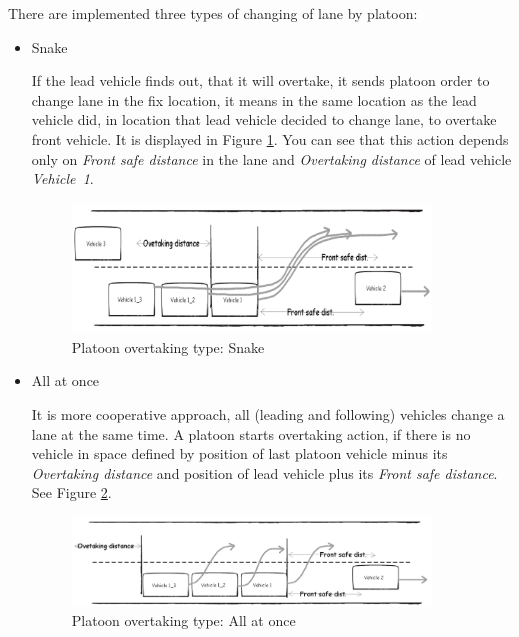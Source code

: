 There are implemented three types of changing of lane by platoon:

\begin{itemize}
\item Snake

If the lead vehicle finds out, that it will overtake, it sends platoon order to change lane in the fix location, it means in the same location as the lead vehicle did, in location that lead vehicle decided to change lane, to overtake front vehicle. It is displayed in Figure \ref{fig:4_2_3_3-8}. You can see that this action depends only on \textit{Front safe distance} in the lane and \textit{Overtaking distance} of lead vehicle \textit{\mbox{Vehicle 1}}.

\begin{figure}[ph]
\centering
\includegraphics[width=0.90\textwidth,height=0.90\textheight,keepaspectratio]{figures/Chapter_4/4_overtaking_snake.png}
\centering
\protect\caption{\label{fig:4_2_3_3-8}Platoon overtaking type: Snake}
\end{figure}

\item All at once

It is more cooperative approach, all (leading and following) vehicles change a lane at the same time. A platoon starts overtaking action, if there is no vehicle in space defined by position of last platoon vehicle minus its \textit{Overtaking distance} and position of lead vehicle plus its \textit{Front safe distance}. See Figure \ref{fig:4_2_3_3-9}.

\begin{figure}[ph]
\centering
\includegraphics[width=0.90\textwidth,height=0.90\textheight,keepaspectratio]{figures/Chapter_4/4_overtaking_allatonce.png}
\centering
\protect\caption{\label{fig:4_2_3_3-9}Platoon overtaking type: All at once}
\end{figure}


\end{itemize}
